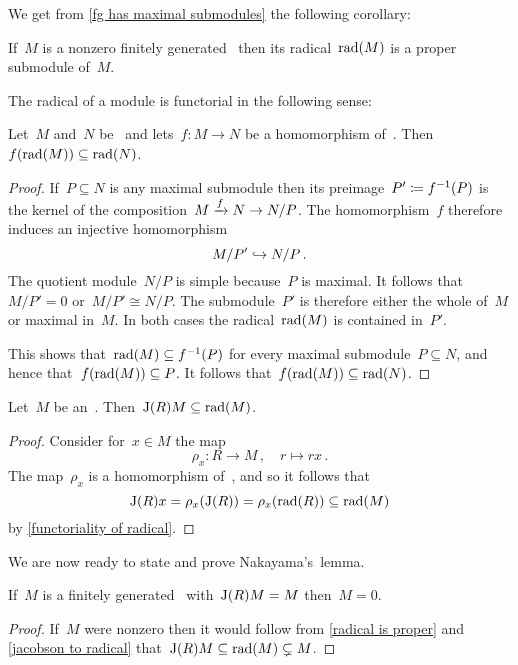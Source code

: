 We get from \cref{fg has maximal submodules} the following corollary:

\begin{corollary}
  \label{radical is proper}
  If~$M$ is a nonzero finitely generated~{} then its radical~$\operatorname{rad}(M)$ is a proper submodule of~$M$.
\end{corollary}

The radical of a module is functorial in the following sense:

\begin{lemma}
  \label{functoriality of radical}
  Let~$M$ and~$N$ be~{} and lets~$f \colon M \to N$ be a homomorphism of~{}.
  Then~$f(\operatorname{rad}(M)) \subseteq \operatorname{rad}(N)$.
\end{lemma}

\begin{proof}
  If~$P \subseteq N$ is any maximal submodule then its preimage~$P' \coloneqq f^{-1}(P)$ is the kernel of the composition~$M \xrightarrow{f} N \to N/P$.
  The homomorphism~$f$ therefore induces an injective homomorphism
  \[
                M/P'
    \hookrightarrow  N/P \,.
  \]
  The quotient module~$N/P$ is simple because~$P$ is maximal.
  It follows that~$M/P' = 0$ or~$M/P' \cong N/P$.
  The submodule~$P'$ is therefore either the whole of~$M$ or maximal in~$M$.
  In both cases the radical~$\operatorname{rad}(M)$ is contained in~$P'$.
  
  This shows that~$\operatorname{rad}(M) \subseteq f^{-1}(P)$ for every maximal submodule~$P \subseteq N$, and hence that~$f(\operatorname{rad}(M)) \subseteq P$.
  It follows that~$f(\operatorname{rad}(M)) \subseteq \operatorname{rad}(N)$.
\end{proof}

\begin{corollary}
  \label{jacobson to radical}
  Let~$M$ be an~{}.
  Then~$\operatorname{J}(R) M \subseteq \operatorname{rad}(M)$.
\end{corollary}

\begin{proof}
  Consider for~$x \in M$ the map
  \[
            \rho_x
    \colon  R
    \to     M \,,
    \quad   r
    \mapsto rx \,.
  \]
  The map~$\rho_x$ is a homomorphism of~{}, and so it follows that
  \[
              \operatorname{J}(R) x
    =         \rho_x( \operatorname{J}(R) )
    =         \rho_x( \operatorname{rad}(R) )
    \subseteq \operatorname{rad}(M)
  \]
  by \cref{functoriality of radical}.
\end{proof}

We are now ready to state and prove Nakayama’s~lemma.

\begin{lemma}[Nakayama]
  If~$M$ is a finitely generated~{} with~$\operatorname{J}(R) M = M$ then~$M = 0$.
\end{lemma}

\begin{proof}
  If~$M$ were nonzero then it would follow from \cref{radical is proper} and \cref{jacobson to radical} that~$\operatorname{J}(R) M \subseteq \operatorname{rad}(M) \subsetneq M$.
\end{proof}





